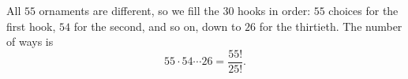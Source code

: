 All $55$ ornaments are different, so we fill the $30$ hooks in order: $55$ choices for the first hook, $54$ for the second, and so on, down to $26$ for the thirtieth. The number of ways is
\[55\cdot54\cdots26=\boxed{\dfrac{55!}{25!}}.\]
